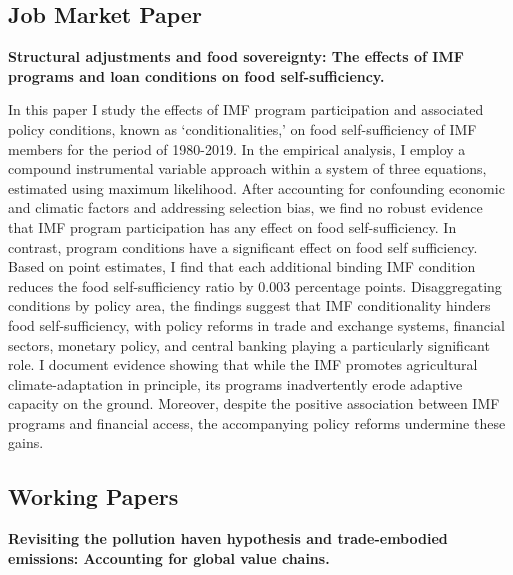 
\subsection{Job Market Paper}

\textbf{Structural adjustments and food sovereignty: The effects of IMF
programs and loan conditions on food self-sufficiency.}
\vspace{1em}

 \parbox{\textwidth}{In this paper I study the effects of IMF program participation and associated policy conditions, known as ‘conditionalities,’ on food self-sufficiency of IMF members for the period of 1980-2019. In the empirical analysis, I employ a compound instrumental variable approach within a system of three equations, estimated using maximum likelihood. After accounting for confounding economic and climatic factors and addressing selection bias, we find no robust evidence that IMF program participation has any effect on food self-sufficiency. In contrast, program conditions have a significant effect on food self sufficiency. Based on point estimates, I find that each additional binding IMF condition reduces the food self-sufficiency ratio by 0.003 percentage points. Disaggregating conditions by policy area, the findings suggest that IMF conditionality hinders food self-sufficiency, with policy reforms in trade and exchange systems, financial sectors, monetary policy, and central banking playing a particularly significant role. I document evidence showing that while the IMF promotes agricultural climate-adaptation in principle, its programs inadvertently erode adaptive capacity on the ground. Moreover, despite the positive association between IMF programs and financial access, the accompanying policy reforms undermine these gains.}

\subsection{Working Papers}

\textbf{Revisiting the pollution haven hypothesis and trade-embodied emissions: Accounting for global value chains.}
\vspace{1em}

